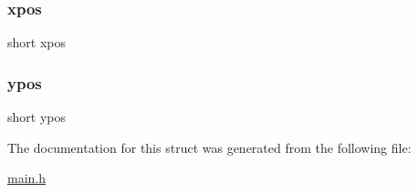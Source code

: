 \mbox{\label{struct_bit_map_image_afa272b892ec389d3e6315449a783b4a5}} 
\subsubsection{\texorpdfstring{xpos}{xpos}}
{\footnotesize\ttfamily short xpos}

\mbox{\label{struct_bit_map_image_a27e151b8be1e198b2aae1b90b1973af1}} 
\subsubsection{\texorpdfstring{ypos}{ypos}}
{\footnotesize\ttfamily short ypos}



The documentation for this struct was generated from the following file\+:\begin{DoxyCompactItemize}
\item 
\hyperlink{main_8h}{main.\+h}\end{DoxyCompactItemize}
